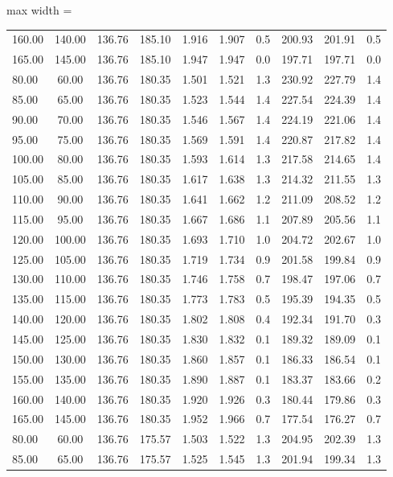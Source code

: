 \documentclass[english]{SPFShortReport}
\begin{document}
\begin{table}[!ht]
\begin{adjustbox}{max width =\textwidth}
\begin{tabular}{l | c c c c c c c c c }
160.00 & 140.00 & 136.76 & 185.10 & 1.916 & 1.907 & 0.5 & 200.93 & 201.91 & 0.5\\ 
165.00 & 145.00 & 136.76 & 185.10 & 1.947 & 1.947 & 0.0 & 197.71 & 197.71 & 0.0\\ 
80.00 & 60.00 & 136.76 & 180.35 & 1.501 & 1.521 & 1.3 & 230.92 & 227.79 & 1.4\\ 
85.00 & 65.00 & 136.76 & 180.35 & 1.523 & 1.544 & 1.4 & 227.54 & 224.39 & 1.4\\ 
90.00 & 70.00 & 136.76 & 180.35 & 1.546 & 1.567 & 1.4 & 224.19 & 221.06 & 1.4\\ 
95.00 & 75.00 & 136.76 & 180.35 & 1.569 & 1.591 & 1.4 & 220.87 & 217.82 & 1.4\\ 
100.00 & 80.00 & 136.76 & 180.35 & 1.593 & 1.614 & 1.3 & 217.58 & 214.65 & 1.4\\ 
105.00 & 85.00 & 136.76 & 180.35 & 1.617 & 1.638 & 1.3 & 214.32 & 211.55 & 1.3\\ 
110.00 & 90.00 & 136.76 & 180.35 & 1.641 & 1.662 & 1.2 & 211.09 & 208.52 & 1.2\\ 
115.00 & 95.00 & 136.76 & 180.35 & 1.667 & 1.686 & 1.1 & 207.89 & 205.56 & 1.1\\ 
120.00 & 100.00 & 136.76 & 180.35 & 1.693 & 1.710 & 1.0 & 204.72 & 202.67 & 1.0\\ 
125.00 & 105.00 & 136.76 & 180.35 & 1.719 & 1.734 & 0.9 & 201.58 & 199.84 & 0.9\\ 
130.00 & 110.00 & 136.76 & 180.35 & 1.746 & 1.758 & 0.7 & 198.47 & 197.06 & 0.7\\ 
135.00 & 115.00 & 136.76 & 180.35 & 1.773 & 1.783 & 0.5 & 195.39 & 194.35 & 0.5\\ 
140.00 & 120.00 & 136.76 & 180.35 & 1.802 & 1.808 & 0.4 & 192.34 & 191.70 & 0.3\\ 
145.00 & 125.00 & 136.76 & 180.35 & 1.830 & 1.832 & 0.1 & 189.32 & 189.09 & 0.1\\ 
150.00 & 130.00 & 136.76 & 180.35 & 1.860 & 1.857 & 0.1 & 186.33 & 186.54 & 0.1\\ 
155.00 & 135.00 & 136.76 & 180.35 & 1.890 & 1.887 & 0.1 & 183.37 & 183.66 & 0.2\\ 
160.00 & 140.00 & 136.76 & 180.35 & 1.920 & 1.926 & 0.3 & 180.44 & 179.86 & 0.3\\ 
165.00 & 145.00 & 136.76 & 180.35 & 1.952 & 1.966 & 0.7 & 177.54 & 176.27 & 0.7\\ 
80.00 & 60.00 & 136.76 & 175.57 & 1.503 & 1.522 & 1.3 & 204.95 & 202.39 & 1.3\\ 
85.00 & 65.00 & 136.76 & 175.57 & 1.525 & 1.545 & 1.3 & 201.94 & 199.34 & 1.3\\ 

\end{tabular}
\end{adjustbox}
\end{table}
\end{document}
